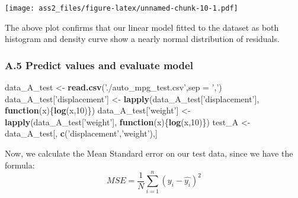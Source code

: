 \documentclass[]{article}
\newenvironment{Shaded}{\begin{snugshade}}{\end{snugshade}}
\newcommand{\KeywordTok}[1]{\textcolor[rgb]{0.13,0.29,0.53}{\textbf{#1}}}
\newcommand{\DataTypeTok}[1]{\textcolor[rgb]{0.13,0.29,0.53}{#1}}
\newcommand{\DecValTok}[1]{\textcolor[rgb]{0.00,0.00,0.81}{#1}}
\newcommand{\StringTok}[1]{\textcolor[rgb]{0.31,0.60,0.02}{#1}}
\newcommand{\ControlFlowTok}[1]{\textcolor[rgb]{0.13,0.29,0.53}{\textbf{#1}}}
\newcommand{\OperatorTok}[1]{\textcolor[rgb]{0.81,0.36,0.00}{\textbf{#1}}}
\newcommand{\NormalTok}[1]{#1}
\begin{document}
\begin{Shaded}
\end{Shaded}

\texttt{[image: ass2\_files/figure-latex/unnamed-chunk-10-1.pdf]}

The above plot confirms that our linear model fitted to the dataset as
both histogram and density curve show a nearly normal distribution of
residuals.

\subsubsection{A.5 Predict values and evaluate
model}\label{a.5-predict-values-and-evaluate-model}

\begin{Shaded}
\begin{Highlighting}[]
\NormalTok{data_A_test <-}\StringTok{ }\KeywordTok{read.csv}\NormalTok{(}\StringTok{'./auto_mpg_test.csv'}\NormalTok{,}\DataTypeTok{sep =} \StringTok{','}\NormalTok{)}
\NormalTok{data_A_test[}\StringTok{'displacement'}\NormalTok{] <-}\StringTok{ }\KeywordTok{lapply}\NormalTok{(data_A_test[}\StringTok{'displacement'}\NormalTok{], }\ControlFlowTok{function}\NormalTok{(x)\{}\KeywordTok{log}\NormalTok{(x,}\DecValTok{10}\NormalTok{)\})}
\NormalTok{data_A_test[}\StringTok{'weight'}\NormalTok{] <-}\StringTok{ }\KeywordTok{lapply}\NormalTok{(data_A_test[}\StringTok{'weight'}\NormalTok{], }\ControlFlowTok{function}\NormalTok{(x)\{}\KeywordTok{log}\NormalTok{(x,}\DecValTok{10}\NormalTok{)\})}
\NormalTok{test_A <-}\StringTok{ }\NormalTok{data_A_test[, }\KeywordTok{c}\NormalTok{(}\StringTok{'displacement'}\NormalTok{,}\StringTok{'weight'}\NormalTok{),]}
\end{Highlighting}
\end{Shaded}

Now, we calculate the Mean Standard error on our test data, since we
have the formula:
\[MSE=\frac { 1 }{ N } \sum _{ i=1 }^{ n }{ (y_{ i }-\hat { y_{ i } } )^{ 2 } } \]
\end{document}
